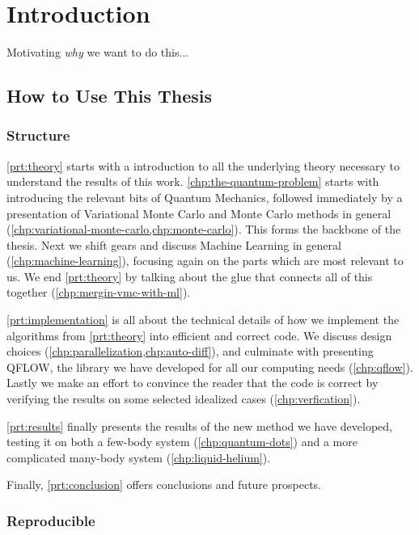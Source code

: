 \documentclass[Thesis.tex]{subfiles}
\begin{document}
\chapter{Introduction}
\label{chp:introduction}

Motivating \emph{why} we want to do this...


\section{How to Use This Thesis}

\subsection{Structure}
\cref{prt:theory} starts with a introduction to all the underlying theory
necessary to understand the results of this work. \cref{chp:the-quantum-problem}
starts with introducing the relevant bits of Quantum Mechanics, followed
immediately by a presentation of Variational Monte Carlo and Monte Carlo methods
in general (\cref{chp:variational-monte-carlo,chp:monte-carlo}). This forms the
backbone of the thesis. Next we shift gears and discuss Machine Learning in
general (\cref{chp:machine-learning}), focusing again on the parts which are
most relevant to us. We end \cref{prt:theory} by talking about the glue that
connects all of this together (\cref{chp:mergin-vmc-with-ml}).

\cref{prt:implementation} is all about the technical details of how we implement
the algorithms from \cref{prt:theory} into efficient and correct code. We
discuss design choices (\cref{chp:parallelization,chp:auto-diff}), and culminate
with presenting QFLOW, the library we have
developed for all our computing needs (\cref{chp:qflow}). Lastly we make an effort to convince the
reader that the code is correct by verifying the results on some
selected idealized cases (\cref{chp:verfication}).

\cref{prt:results} finally presents the results of the new method we have
developed, testing it on both a few-body system (\cref{chp:quantum-dots}) and a
more complicated many-body system (\cref{chp:liquid-helium}). 

Finally, \cref{prt:conclusion} offers conclusions and future prospects.

\subsection{Reproducible}
\end{document}
